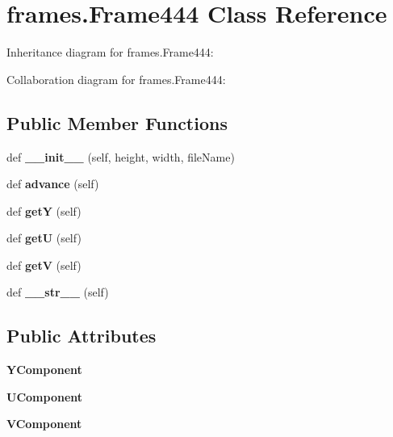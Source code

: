 \hypertarget{classframes_1_1Frame444}{}\section{frames.\+Frame444 Class Reference}
\label{classframes_1_1Frame444}


Inheritance diagram for frames.\+Frame444\+:


Collaboration diagram for frames.\+Frame444\+:
\subsection*{Public Member Functions}
\begin{DoxyCompactItemize}
\item 
\mbox{\label{classframes_1_1Frame444_a73a5d9f094f287fcecda59e62e926348}} 
def {\bfseries \+\_\+\+\_\+init\+\_\+\+\_\+} (self, height, width, file\+Name)
\item 
\mbox{\label{classframes_1_1Frame444_aab6e270877720a2e0b3cb897d954a525}} 
def {\bfseries advance} (self)
\item 
\mbox{\label{classframes_1_1Frame444_a2ffd342612d1bc19fbb36f793ffe94f3}} 
def {\bfseries getY} (self)
\item 
\mbox{\label{classframes_1_1Frame444_a477e8105bbbb19fd23776c4212b46f67}} 
def {\bfseries getU} (self)
\item 
\mbox{\label{classframes_1_1Frame444_abbb31b78f0ab601ddeda5cd57ffdca6c}} 
def {\bfseries getV} (self)
\item 
\mbox{\label{classframes_1_1Frame444_a1ec6a56f18d35ec88bc2ba02ec1b00f6}} 
def {\bfseries \+\_\+\+\_\+str\+\_\+\+\_\+} (self)
\end{DoxyCompactItemize}
\subsection*{Public Attributes}
\begin{DoxyCompactItemize}
\item 
\mbox{\label{classframes_1_1Frame444_ac8dac4affd82bed6695b7dee73214942}} 
{\bfseries Y\+Component}
\item 
\mbox{\label{classframes_1_1Frame444_a680d2b65ffbb1387afa64a79b9715042}} 
{\bfseries U\+Component}
\item 
\mbox{\label{classframes_1_1Frame444_ac000d62c62c99ea0217f4b497792e4e5}} 
{\bfseries V\+Component}
\end{DoxyCompactItemize}


